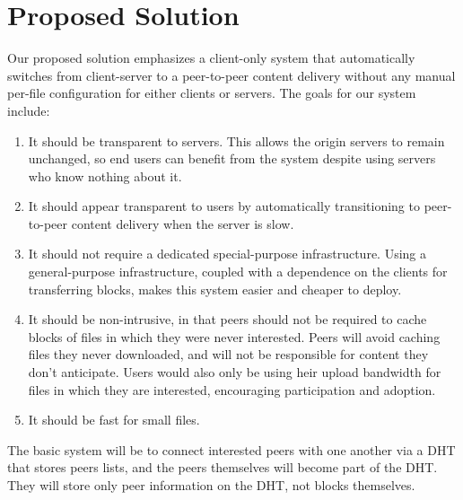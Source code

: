 \section {Proposed Solution}\label{section:solution}
Our proposed solution emphasizes a client-only system that automatically switches from client-server to a peer-to-peer content delivery without any manual per-file configuration for either clients or servers.  The goals for our system include:
\begin{enumerate}
\item It should be transparent to servers.  This allows the origin servers to remain unchanged, so end users can benefit from the system despite using servers who know nothing about it.
\item It should appear transparent to users by automatically transitioning to peer-to-peer content delivery when the server is slow.
\item It should not require a dedicated special-purpose infrastructure.  Using a general-purpose infrastructure, coupled with a dependence on the clients for transferring blocks, makes this system easier and cheaper to deploy.
\item It should be non-intrusive, in that peers should not be required to cache blocks of files in which they were never interested.  Peers will avoid caching files they never downloaded, and will not be responsible for content they don't anticipate.  Users would also only be using heir upload bandwidth for files in which they are interested, encouraging participation and adoption.
\item It should be fast for small files.
\end{enumerate}

The basic system will be to connect interested peers with one another via a DHT that stores peers lists, and the peers themselves will become part of the DHT.  They will store only peer information on the DHT, not blocks themselves.


